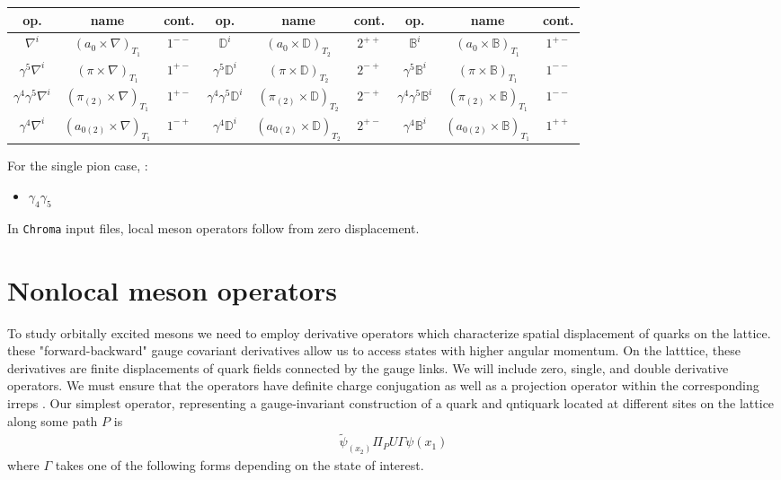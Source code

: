 \begin{table}
\begin{tabular}{ccc|ccc|ccc}
    op. & name & cont.  & op. & name & cont. & op. & name & cont.\\
    \hline
    $\nabla^i$ & $(a_0 \times \nabla)_{T_1}$ & $1^{--}$ & $\mathbb{D}^i $ & $(a_0
    \times \mathbb{D})_{T_2}$ & $2^{++}$ & $\mathbb{B}^i$ & $(a_0
    \times \mathbb{B})_{T_1}$ & $1^{+-}$ \\
    $\gamma^5 \nabla^i$ & $(\pi \times \nabla)_{T_1}$ & $1^{+-}$  &
    $\gamma^5 \mathbb{D}^i $ & $(\pi
    \times \mathbb{D})_{T_2}$ & $2^{-+}$ & $\gamma^5 \mathbb{B}^i$ & $(\pi
    \times \mathbb{B})_{T_1}$ & $1^{--}$ \\
    $\gamma^4 \gamma^5 \nabla^i$ & $(\pi_{(2)} \times \nabla)_{T_1}$ &
    $1^{+-}$ & $\gamma^4 \gamma^5 \mathbb{D}^i $ & $(\pi_{(2)}
    \times \mathbb{D})_{T_2}$ & $2^{-+}$ & $\gamma^4 \gamma^5 \mathbb{B}^i$ & $(\pi_{(2)}
    \times \mathbb{B})_{T_1}$ & $1^{--}$ \\
    $\gamma^4 \nabla^i$ & $(a_{0(2)} \times \nabla)_{T_1}$ & $1^{-+}$ &
    $\gamma^4 \mathbb{D}^i $ & $(a_{0(2)}
    \times \mathbb{D})_{T_2}$ & $2^{+-}$ & $\gamma^4 \mathbb{B}^i$ & $(a_{0(2)}
    \times \mathbb{B})_{T_1}$ & $1^{++}$ \\

\end{tabular}


For the single pion case, : 
\begin{itemize}
    \item $\gamma_4\gamma_5$

\end{itemize}
In \texttt{Chroma} input files, local meson operators follow from zero displacement. 

\section{Nonlocal meson operators}
To study orbitally excited mesons we need to employ derivative operators which characterize spatial displacement of quarks on the lattice.
these "forward-backward" gauge covariant derivatives allow us to access states with higher angular momentum. On the latttice, these derivatives are finite displacements of quark fields connected by the gauge links. We will include zero, single, and double derivative operators. We must ensure that the operators have definite charge conjugation as well as a projection operator within the corresponding irreps \cite{liao2002excitedcharmoniumspectrumanisotropic}. Our simplest operator, representing a gauge-invariant construction of a quark and qntiquark located at different sites on the lattice along some path $P$ is 
\begin{align}
    \tilde{\psi}_(x_2)\Pi_P U \Gamma \psi(x_1)
\end{align}
where $\Gamma$ takes one of the following forms depending on the state of interest. 


\end{table}
